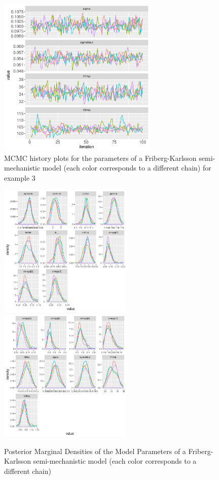 \documentclass[10pt, reqno, oneside]{amsbook}
\numberwithin{equation}{chapter}
\numberwithin{figure}{chapter}
\numberwithin{table}{chapter}
\theoremstyle{remark}
\begin{document}
\begin{figure}[htbp]
\includegraphics[width=3.0in,trim=0in 0in 0 0in]{graphics/neutropenia_0.82/neutropeniaPopulationPlots004.pdf}
\caption{{MCMC history plots for the parameters of a Friberg-Karlsson semi-mechanistic model (each color corresponds to a different chain) for example 3}}
\label{FKMCMC}
\end{figure}

\begin{figure}[htbp]
\includegraphics[width=2.5in,trim=0in 0in 0 0in]{graphics/neutropenia_0.82/neutropeniaPopulationPlots005.pdf}
\includegraphics[width=2.5in,trim=0in 0in 0 0in]{graphics/neutropenia_0.82/neutropeniaPopulationPlots006.pdf}
\caption{{Posterior Marginal Densities of the Model Parameters of a Friberg-Karlsson semi-mechanistic model (each color corresponds to a different chain)}}
\label{FKDens}
\end{figure}
\end{document}

